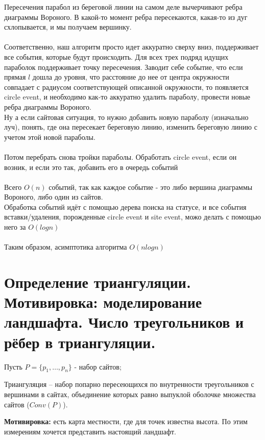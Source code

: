Пересечения парабол из береговой линии на самом деле вычерчивают ребра диаграммы Вороного. В какой-то момент ребра пересекаются, какая-то из дуг схлопывается, и мы получаем вершинку.
\\
\\
Соответственно, наш алгоритм просто идет аккуратно сверху вниз, поддерживает все события, которые будут происходить. Для всех трех подряд идущих параболок поддерживает точку пересечения. Заводит себе событие, что если прямая $l$ дошла до уровня, что расстояние до нее от центра окружности совпадает с радиусом соответствующей описанной окружности, то появляется circle event, и необходимо как-то аккуратно удалить параболу, провести новые ребра диаграммы Вороного.
\\
 Ну а если сайтовая ситуация, то нужно добавить новую параболу (изначально луч), понять, где она пересекает береговую линию, изменить береговую линию с учетом этой новой параболы.
 \\
 \\
 Потом перебрать снова тройки параболы. Обработать circle event, если он возник, и если это так, добавить его в очередь событий
\\
\\
Всего $O(n)$ событий, так как каждое событие - это либо вершина диаграммы Вороного, либо один из сайтов.
\\
Обработка событий идёт с помощью дерева поиска на статусе, и все события вставки/удаления, порожденные circle event и site event, можо делать с помощью него за $O(log n)$
\\
\\
Таким образом, асимптотика алгоритма $O(n log n)$

\newpage{}

\section{Определение триангуляции. Мотивировка: моделирование ландшафта. Число треугольников и рёбер в триангуляции.}

Пусть $P = \{p_1, \dots, p_n \}$ - набор сайтов; 

\Def Триангуляция -- набор попарно пересеющихся по внутренности треугольников с вершинами в сайтах, объединение которых равно выпуклой оболочке множества сайтов ($Conv(P)$).


\textbf{Мотивировка:} есть карта местности, где для точек известна высота. По этим измерениям хочется представить настоящий ландшафт.

